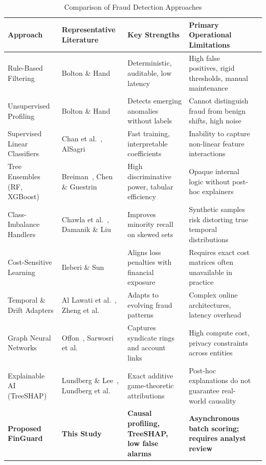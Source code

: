 \documentclass[conference]{IEEEtran}
\begin{document}
\begin{table}[t]
\centering
\caption{Comparison of Fraud Detection Approaches}
\label{tab:related_work}
\small
\begin{tabular}{lllll}
\toprule
\textbf{Approach} & \textbf{Representative Literature} & \textbf{Key Strengths} & \textbf{Primary Operational Limitations} \\
\midrule
Rule-Based Filtering & Bolton \& Hand~\cite{bolton2002unsupervised} & Deterministic, auditable, low latency & High false positives, rigid thresholds, manual maintenance \\
Unsupervised Profiling & Bolton \& Hand~\cite{bolton2002unsupervised} & Detects emerging anomalies without labels & Cannot distinguish fraud from benign shifts, high noise \\
Supervised Linear Classifiers & Chan et al.~\cite{chan2015using}, AlSagri~\cite{alsagri2025hybrid} & Fast training, interpretable coefficients & Inability to capture non-linear feature interactions \\
Tree Ensembles (RF, XGBoost) & Breiman~\cite{breiman2001random}, Chen \& Guestrin~\cite{chen2016xgboost} & High discriminative power, tabular efficiency & Opaque internal logic without post-hoc explainers \\
Class-Imbalance Handlers & Chawla et al.~\cite{chawla2002smote}, Damanik \& Liu~\cite{damanik2025advanced} & Improves minority recall on skewed sets & Synthetic samples risk distorting true temporal distributions \\
Cost-Sensitive Learning & Ileberi \& Sun~\cite{ileberi2025performance} & Aligns loss penalties with financial exposure & Requires exact cost matrices often unavailable in practice \\
Temporal \& Drift Adapters & Al Lawati et al.~\cite{allawati2025integrated}, Zheng et al.~\cite{zheng2025integrated} & Adapts to evolving fraud patterns & Complex online architectures, latency overhead \\
Graph Neural Networks & Offon~\cite{offon2026hybrid}, Sarwosri et al.~\cite{sarwosri2026ecommerce} & Captures syndicate rings and account links & High compute cost, privacy constraints across entities \\
Explainable AI (TreeSHAP) & Lundberg \& Lee~\cite{lundberg2017unified}, Lundberg et al.~\cite{lundberg2020local} & Exact additive game-theoretic attributions & Post-hoc explanations do not guarantee real-world causality \\
\textbf{Proposed FinGuard} & \textbf{This Study} & \textbf{Causal profiling, TreeSHAP, low false alarms} & \textbf{Asynchronous batch scoring; requires analyst review} \\
\bottomrule
\end{tabular}
\end{table}
\end{document}
